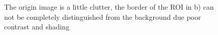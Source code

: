 \begin{figure} 
  \begin{minipage}[t]{0.45\linewidth} 
    \centering 
  \end{minipage}%
  \begin{minipage}[t]{0.45\linewidth} 
    \centering 
  \end{minipage}
\caption[Segmentation a flower petal from a cluster of flowers]{The
  origin image is a little clutter, the border of the ROI in b) can
  not be completely distinguished from the background due poor
  contrast and shading}
\label{fig:flower_m}
\end{figure}

